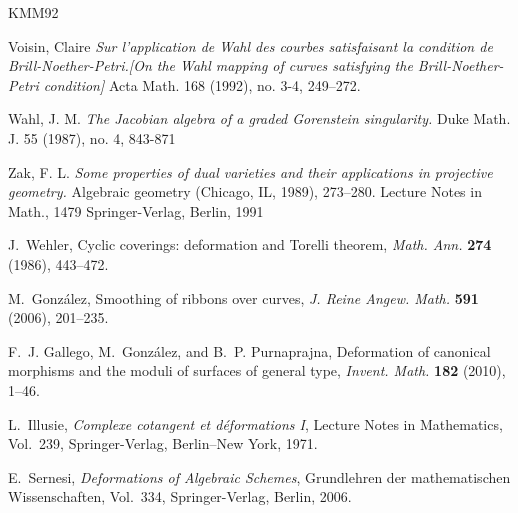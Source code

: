 \documentclass[11pt,twoside]{amsart}
\theoremstyle{plain}
\numberwithin{equation}{section}
\theoremstyle{definition}
\begin{document}
\begin{thebibliography}{KMM92}


Voisin, Claire
\emph{Sur l'application de Wahl des courbes satisfaisant la condition de Brill-Noether-Petri.[On the Wahl mapping of curves satisfying the Brill-Noether-Petri condition]}
Acta Math. 168 (1992), no. 3-4, 249–272.






Wahl, J. M. 
\emph{The Jacobian algebra of a graded Gorenstein singularity.}
Duke Math. J. 55 (1987), no. 4,
843-871

Zak, F. L.
\emph{Some properties of dual varieties and their applications in projective geometry.}
Algebraic geometry (Chicago, IL, 1989), 273–280.
Lecture Notes in Math., 1479
Springer-Verlag, Berlin, 1991

J.~Wehler,
\newblock Cyclic coverings: deformation and Torelli theorem,
\newblock \emph{Math. Ann.} \textbf{274} (1986), 443--472.

M.~Gonz\'alez,
\newblock Smoothing of ribbons over curves,
\newblock \emph{J. Reine Angew. Math.} \textbf{591} (2006), 201--235.

F.~J. Gallego, M.~Gonz\'alez, and B.~P. Purnaprajna,
\newblock Deformation of canonical morphisms and the moduli of surfaces of general type,
\newblock \emph{Invent. Math.} \textbf{182} (2010), 1--46.

L.~Illusie,
\newblock \emph{Complexe cotangent et d\'eformations I},
\newblock Lecture Notes in Mathematics, Vol.~239,
\newblock Springer-Verlag, Berlin--New York, 1971.

E.~Sernesi,
\newblock \emph{Deformations of Algebraic Schemes},
\newblock Grundlehren der mathematischen Wissenschaften, Vol.~334,
\newblock Springer-Verlag, Berlin, 2006.




 
\end{thebibliography}
\end{document}
